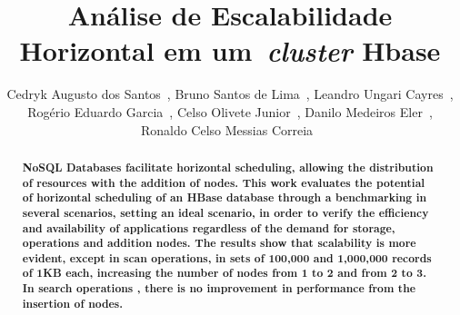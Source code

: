 \documentclass[12pt]{article}
\title{Análise de Escalabilidade Horizontal em um~\emph{cluster}  Hbase}
\author{Cedryk Augusto dos Santos~\inst{1}, Bruno Santos de Lima~\inst{1}, Leandro Ungari Cayres~\inst{1},\\Rogério Eduardo Garcia~\inst{1}, Celso Olivete Junior~\inst{1}, Danilo Medeiros Eler~\inst{1},\\ Ronaldo Celso Messias Correia~\inst{1}}
\begin{document}
 

\maketitle


\begin{abstract}
\textbf{NoSQL Databases facilitate horizontal scheduling, allowing the distribution of resources with the addition of nodes. This work evaluates the potential of horizontal scheduling of an HBase database through a benchmarking in several scenarios, setting an ideal scenario, in order to verify the efficiency and availability of applications regardless of the demand for storage, operations and addition nodes. The results show that scalability is more evident, except in scan operations, in sets of 100,000 and 1,000,000 records of 1KB each, increasing the number of nodes from 1 to 2 and from 2 to 3. In search operations , there is no improvement in performance from the insertion of nodes.}
\end{abstract}
     
\end{document}
